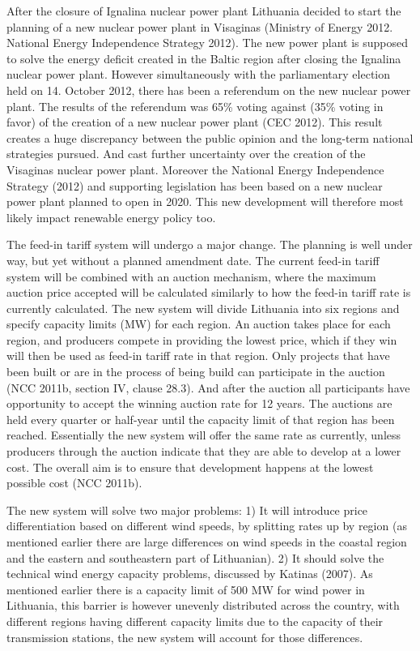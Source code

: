 \documentclass[a4paper, 12pt]{article}
\begin{document}
After the closure of Ignalina nuclear power plant Lithuania decided to start the planning of a new nuclear power plant in Visaginas (Ministry of Energy 2012. National Energy Independence Strategy 2012). The new power plant is supposed to solve the energy deficit created in the Baltic region after closing the Ignalina nuclear power plant. However simultaneously with the parliamentary election held on 14. October 2012, there has been a referendum on the new nuclear power plant. The results of the referendum was 65\% voting against (35\% voting in favor) of the creation of a new nuclear power plant (CEC 2012). This result creates a huge discrepancy between the public opinion and the long-term national strategies pursued. And cast further uncertainty over the creation of the Visaginas nuclear power plant. Moreover the National Energy Independence Strategy (2012) and supporting legislation has been based on a new nuclear power plant planned to open in 2020. This new development will therefore most likely impact renewable energy policy too.

The feed-in tariff system will undergo a major change. The planning is well under way, but yet without a planned amendment date. The current feed-in tariff system will be combined with an auction mechanism, where the maximum auction price accepted will be calculated similarly to how the feed-in tariff rate is currently calculated. The new system will divide Lithuania into six regions and specify capacity limits (MW) for each region. An auction takes place for each region, and producers compete in providing the lowest price, which if they win will then be used as feed-in tariff rate in that region. Only projects that have been built or are in the process of being build can participate in the auction (NCC 2011b, section IV, clause 28.3). And after the auction all participants have opportunity to accept the winning auction rate for 12 years. The auctions are held every quarter or half-year until the capacity limit of that region has been reached. Essentially the new system will offer the same rate as currently, unless producers through the auction indicate that they are able to develop at a lower cost. The overall aim is to ensure that development happens at the lowest possible cost (NCC 2011b).

The new system will solve two major problems: 1) It will introduce price differentiation based on different wind speeds, by splitting rates up by region (as mentioned earlier there are large differences on wind speeds in the coastal region and the eastern and southeastern part of Lithuanian). 2) It should solve the technical wind energy capacity problems, discussed by Katinas (2007). As mentioned earlier there is a capacity limit of 500 MW for wind power in Lithuania, this barrier is however unevenly distributed across the country, with different regions having different capacity limits due to the capacity of their transmission stations, the new system will account for those differences.
\end{document}
